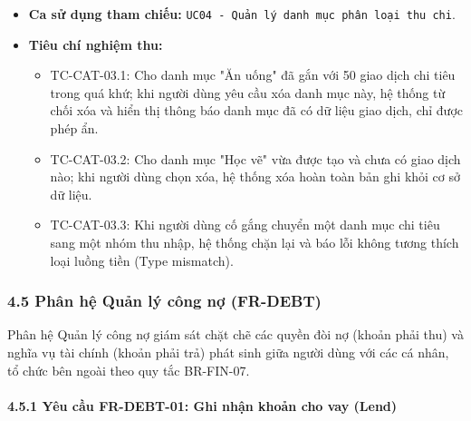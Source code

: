 \documentclass[11pt,a4paper]{article}
\providecommand{\tightlist}{
  \setlength{\itemsep}{0pt}\setlength{\parskip}{0pt}}
\begin{document}
\begin{itemize}
  \begin{itemize}
  \tightlist
  \item
    Kết quả thực hiện thao tác xóa hoặc chỉnh sửa thành công.
  \item
    Thông báo từ chối thao tác nêu rõ lý do ràng buộc dữ liệu nếu vi
    phạm quy tắc toàn vẹn.
  \end{itemize}
\item
  \textbf{Ca sử dụng tham chiếu:}
  \texttt{UC04\ -\ Quản\ lý\ danh\ mục\ phân\ loại\ thu\ chi}.
\item
  \textbf{Tiêu chí nghiệm thu:}

  \begin{itemize}
  \tightlist
  \item
    TC-CAT-03.1: Cho danh mục "Ăn uống" đã gắn với 50 giao dịch chi tiêu
    trong quá khứ; khi người dùng yêu cầu xóa danh mục này, hệ thống từ
    chối xóa và hiển thị thông báo danh mục đã có dữ liệu giao dịch, chỉ
    được phép ẩn.
  \item
    TC-CAT-03.2: Cho danh mục "Học vẽ" vừa được tạo và chưa có giao dịch
    nào; khi người dùng chọn xóa, hệ thống xóa hoàn toàn bản ghi khỏi cơ
    sở dữ liệu.
  \item
    TC-CAT-03.3: Khi người dùng cố gắng chuyển một danh mục chi tiêu
    sang một nhóm thu nhập, hệ thống chặn lại và báo lỗi không tương
    thích loại luồng tiền (Type mismatch).
  \end{itemize}
\end{itemize}

\newpage

\subsubsection{4.5 Phân hệ Quản lý công nợ
(FR-DEBT)}\label{45-phuxe2n-hux1ec7-quux1ea3n-luxfd-cuxf4ng-nux1ee3-fr-debt}

Phân hệ Quản lý công nợ giám sát chặt chẽ các quyền đòi nợ (khoản phải
thu) và nghĩa vụ tài chính (khoản phải trả) phát sinh giữa người dùng
với các cá nhân, tổ chức bên ngoài theo quy tắc BR-FIN-07.

\paragraph{4.5.1 Yêu cầu FR-DEBT-01: Ghi nhận khoản cho vay
(Lend)}\label{451-yuxeau-cux1ea7u-fr-debt-01-ghi-nhux1eadn-khoux1ea3n-cho-vay-lend}
\end{document}
